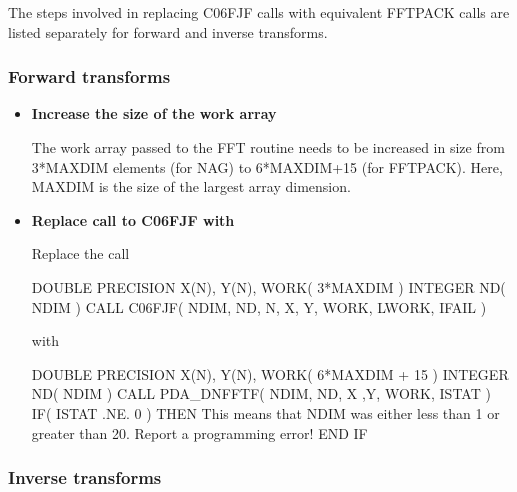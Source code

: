 \documentclass[11pt,twoside,nolof]{starlink}
\begin{document}
   The steps involved in replacing C06FJF calls with
   equivalent FFTPACK calls are listed separately for forward and
   inverse transforms.


\subsubsection{Forward transforms}

\begin{itemize}

\item\textbf{Increase the size of the work array}

   The work array passed to the FFT routine needs to be increased in
   size from 3*MAXDIM elements (for NAG) to 6*MAXDIM+15 (for FFTPACK).
   Here, MAXDIM is the size of the largest array dimension.

\item\textbf{Replace call to C06FJF with
}

   Replace the call

\begin{terminalv}
      DOUBLE PRECISION X(N), Y(N), WORK( 3*MAXDIM )
      INTEGER ND( NDIM )
      CALL C06FJF( NDIM, ND, N, X, Y, WORK, LWORK, IFAIL )
\end{terminalv}

   with

\begin{terminalv}
      DOUBLE PRECISION X(N), Y(N), WORK( 6*MAXDIM + 15 )
      INTEGER ND( NDIM )
      CALL PDA_DNFFTF( NDIM, ND, X ,Y, WORK, ISTAT )
      IF( ISTAT .NE. 0 ) THEN
         This means that NDIM was either less than 1 or greater than 20.
         Report a programming error!
      END IF
\end{terminalv}

\end{itemize}


\subsubsection{Inverse transforms}
\end{document}
